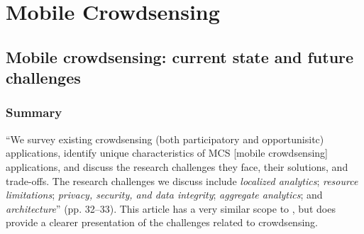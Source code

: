 \section{Mobile Crowdsensing}
\subsection{Mobile crowdsensing: current state and future challenges}
\subsubsection*{Summary}
``We survey existing crowdsensing (both participatory and opportunisitc) applications, identify unique characteristics of MCS [mobile crowdsensing] applications, and discuss the research challenges they face, their solutions, and trade-offs. The research challenges we discuss include \emph{localized analytics}; \emph{resource limitations}; \emph{privacy, security, and data integrity}; \emph{aggregate analytics}; and \emph{architecture}'' (pp. 32--33). This article has a very similar scope to \cite{Lane2010}, but does provide a clearer presentation of the challenges related to crowdsensing.
